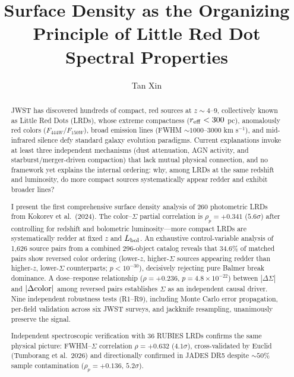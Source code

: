 \documentclass[apj,twocolumn,longbibliography,linenumbers]{aastex701}
\begin{document}
\title{Surface Density as the Organizing Principle of Little Red Dot
Spectral Properties}

\author{Tan Xin}



\begin{abstract}
JWST has discovered hundreds of compact, red sources at $z \sim 4$--$9$, collectively known as Little Red Dots (LRDs), whose extreme compactness ($r_{\rm eff} < 300$ pc), anomalously red colors ($F_{444W}/F_{150W}$), broad emission lines (FWHM $\sim 1000$--$3000$ km s$^{-1}$), and mid-infrared silence defy standard galaxy evolution paradigms. Current explanations invoke at least three independent mechanisms (dust attenuation, AGN activity, and starburst/merger-driven compaction) that lack mutual physical connection, and no framework yet explains the internal ordering: why, among LRDs at the same redshift and luminosity, do more compact sources systematically appear redder and exhibit broader lines?

I present the first comprehensive surface density analysis of 260 photometric LRDs from Kokorev et al.\ (2024). The color--$\Sigma$ partial correlation is $\rho_p = +0.341$ ($5.6\sigma$) after controlling for redshift and bolometric luminosity---more compact LRDs are systematically redder at fixed $z$ and $L_{\rm bol}$. An exhaustive control-variable analysis of 1,626 source pairs from a combined 296-object catalog reveals that 34.6\% of matched pairs show reversed color ordering (lower-$z$, higher-$\Sigma$ sources appearing redder than higher-$z$, lower-$\Sigma$ counterparts; $p < 10^{-30}$), decisively rejecting pure Balmer break dominance. A dose--response relationship ($\rho = +0.236$, $p = 4.8 \times 10^{-22}$) between $|\Delta\Sigma|$ and $|\Delta{\rm color}|$ among reversed pairs establishes $\Sigma$ as an independent causal driver. Nine independent robustness tests (R1--R9), including Monte Carlo error propagation, per-field validation across six JWST surveys, and jackknife resampling, unanimously preserve the signal.

Independent spectroscopic verification with 36 RUBIES LRDs confirms the same physical picture: FWHM--$\Sigma$ correlation $\rho = +0.632$ ($4.1\sigma$), cross-validated by Euclid (Tumborang et al.\ 2026) and directionally confirmed in JADES DR5 despite ${\sim}50\%$ sample contamination ($\rho_p = +0.136$, $5.2\sigma$).


\end{abstract}
\end{document}
